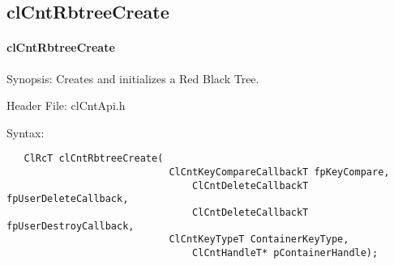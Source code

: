 \subsection{clCntRbtreeCreate}
\hypertarget{pagecnt103}{}\paragraph{cl\-Cnt\-Rbtree\-Create}\label{pagecnt103}
\begin{Desc}
\item[Synopsis:]Creates and initializes a Red Black Tree.\end{Desc}
\begin{Desc}
\item[Header File:]clCntApi.h\end{Desc}
\begin{Desc}
\item[Syntax:]

\footnotesize\begin{verbatim}   ClRcT clCntRbtreeCreate(
          	      			ClCntKeyCompareCallbackT fpKeyCompare,
                      			ClCntDeleteCallbackT fpUserDeleteCallback,
                      			ClCntDeleteCallbackT fpUserDestroyCallback,
          	      			ClCntKeyTypeT ContainerKeyType,
                      			ClCntHandleT* pContainerHandle);
\end{verbatim}
\normalsize
\end{Desc}
